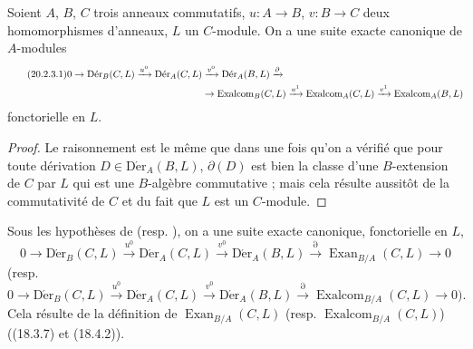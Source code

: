 \begin{corollary}[20.2.3]
\label{0.20.2.3-fr}
Soient $A$, $B$, $C$ trois anneaux commutatifs, $u:A\to B$, $v:B\to C$
deux homomorphismes d'anneaux, $L$ un $C$-module. On a une suite exacte
canonique de $A$-modules
\begin{align}
\tag{20.2.3.1}
\label{0.20.2.3.1-fr}
  0\to\operatorname{D\acute{e}r}_B(C,L)\xrightarrow{u^0}
  \operatorname{D\acute{e}r}_A(C,L)&\xrightarrow{v^0}
  \operatorname{D\acute{e}r}_A(B,L)\xrightarrow{\partial} \\
  &\to\operatorname{Exalcom}_B(C,L)\xrightarrow{u^1}
  \operatorname{Exalcom}_A(C,L)\xrightarrow{v^1}
  \operatorname{Exalcom}_A(B,L) \notag
\end{align}
fonctorielle en $L$.
\end{corollary}

\begin{proof}
Le raisonnement est le même que dans  une fois qu'on a
vérifié que pour toute dérivation $D\in\operatorname{D\acute{e}r}_A(B,L)$,
$\partial(D)$ est bien la classe d'une $B$-extension de $C$ par $L$ qui est
une $B$-algèbre commutative ; mais cela résulte aussitôt de la commutativité
de $C$ et du fait que $L$ est un $C$-module.
\end{proof}

\begin{corollary}[20.2.4]
\label{0.20.2.4-fr}
Sous les hypothèses de  (resp.
), on a une suite exacte canonique, fonctorielle en $L$,
\begin{equation}
\tag{20.2.4.1}
\label{0.20.2.4.1-fr}
  0\to\operatorname{D\acute{e}r}_B(C,L)\xrightarrow{u^0}
  \operatorname{D\acute{e}r}_A(C,L)\xrightarrow{v^0}
  \operatorname{D\acute{e}r}_A(B,L)\xrightarrow{\partial}
  \operatorname{Exan}_{B/A}(C,L)\to0
\end{equation}
(resp.
\begin{equation}
\tag{20.2.4.2}
\label{0.20.2.4.2-fr}
  0\to\operatorname{D\acute{e}r}_B(C,L)\xrightarrow{u^0}
  \operatorname{D\acute{e}r}_A(C,L)\xrightarrow{v^0}
  \operatorname{D\acute{e}r}_A(B,L)\xrightarrow{\partial}
  \operatorname{Exalcom}_{B/A}(C,L)\to0\text{).}
\end{equation}
Cela résulte de la définition de $\operatorname{Exan}_{B/A}(C,L)$ (resp.
$\operatorname{Exalcom}_{B/A}(C,L)$) ((18.3.7) et (18.4.2)).
\end{corollary}

